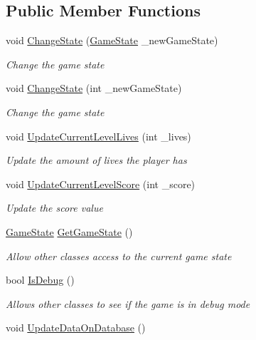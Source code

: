 \subsection*{Public Member Functions}
\begin{DoxyCompactItemize}
\item 
void \mbox{\hyperlink{class_game_manager_a38cc549d56890d3d3097e0a81fd7428f}{Change\+State}} (\mbox{\hyperlink{_game_manager_8cs_a7899b65f1ea0f655e4bbf8d2a5714285}{Game\+State}} \+\_\+new\+Game\+State)
\begin{DoxyCompactList}\small\item\em Change the game state \end{DoxyCompactList}\item 
void \mbox{\hyperlink{class_game_manager_a1ba9d9459bb03a4046de5fc82734c612}{Change\+State}} (int \+\_\+new\+Game\+State)
\begin{DoxyCompactList}\small\item\em Change the game state \end{DoxyCompactList}\item 
void \mbox{\hyperlink{class_game_manager_a66796650182ecf1f1dc98c8ee889d1a0}{Update\+Current\+Level\+Lives}} (int \+\_\+lives)
\begin{DoxyCompactList}\small\item\em Update the amount of lives the player has \end{DoxyCompactList}\item 
void \mbox{\hyperlink{class_game_manager_ae77f42a6ee1bb7d5192709d24cf6ed34}{Update\+Current\+Level\+Score}} (int \+\_\+score)
\begin{DoxyCompactList}\small\item\em Update the score value \end{DoxyCompactList}\item 
\mbox{\hyperlink{_game_manager_8cs_a7899b65f1ea0f655e4bbf8d2a5714285}{Game\+State}} \mbox{\hyperlink{class_game_manager_a58134230a7cde001ebf2b25f1dcd6091}{Get\+Game\+State}} ()
\begin{DoxyCompactList}\small\item\em Allow other classes access to the current game state \end{DoxyCompactList}\item 
bool \mbox{\hyperlink{class_game_manager_a35822d3c950f5d43e34c2f020d46c23d}{Is\+Debug}} ()
\begin{DoxyCompactList}\small\item\em Allows other classes to see if the game is in debug mode \end{DoxyCompactList}\item 
void \mbox{\hyperlink{class_game_manager_a8778b6ae7b19b87aff284883c2bda04a}{Update\+Data\+On\+Database}} ()
\end{DoxyCompactItemize}
